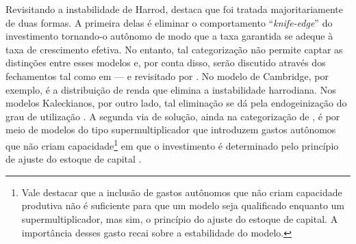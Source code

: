 Revisitando a instabilidade de Harrod, \textcite{allain_macroeconomic_2014} destaca que foi tratada majoritariamente de duas formas. A primeira delas é eliminar o comportamento  ``\textit{knife-edge}'' do investimento tornando-o autônomo de modo que a taxa garantida se adeque à taxa de crescimento efetiva. No entanto, tal categorização não permite captar as distinções entre esses modelos e, por conta disso, serão discutido através dos fechamentos tal como em \textcite{serrano_long_1995} --- e revisitado por \textcite{serrano_har_2018}. No modelo de Cambridge, por exemplo, é a distribuição de renda que elimina a instabilidade harrodiana. Nos modelos Kaleckianos, por outro lado, tal eliminação  se dá pela endogeinização do grau de utilização
.
A segunda via de solução, ainda na categorização de \textcite{allain_macroeconomic_2014}, é por meio de modelos do tipo supermultiplicador que introduzem gastos autônomos que não criam capacidade\footnote{Vale destacar que a inclusão de gastos autônomos que não criam capacidade produtiva não é suficiente para que um modelo seja qualificado enquanto um supermultiplicador, mas sim, o princípio do ajuste do estoque de capital. A importância desses gasto recai sobre a estabilidade do modelo.} em que o investimento é determinado pelo princípio de ajuste do estoque de capital \cites{serrano_long_1995}{serrano_sraffian_1995}{bortis_institutions_1996}
.



